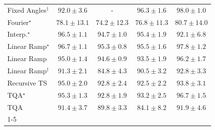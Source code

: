 \begin{tabular}{l|cccc|}
Fixed Angles$^\dagger$ & {\cellcolor[HTML]{056EAD}} \color[HTML]{F1F1F1} $92.0\pm 3.6$ & {\cellcolor[HTML]{000000}} \color[HTML]{F1F1F1} {\cellcolor{white}} \color{black} - & {\cellcolor[HTML]{034F7D}} \color[HTML]{F1F1F1} $96.3\pm 1.6$ & {\cellcolor[HTML]{023E62}} \color[HTML]{F1F1F1} $98.0\pm 1.0$ \\
Fourier$^\star$ & {\cellcolor[HTML]{CDD0E5}} \color[HTML]{000000} $78.1\pm 13.1$ & {\cellcolor[HTML]{EDE7F2}} \color[HTML]{000000} $74.2\pm 12.3$ & {\cellcolor[HTML]{D8D7E9}} \color[HTML]{000000} $76.8\pm 11.3$ & {\cellcolor[HTML]{ADC1DD}} \color[HTML]{000000} $80.7\pm 14.0$ \\
Interp.$^\star$ & {\cellcolor[HTML]{034D79}} \color[HTML]{F1F1F1} $96.5\pm 1.1$ & {\cellcolor[HTML]{045D92}} \color[HTML]{F1F1F1} $94.7\pm 1.0$ & {\cellcolor[HTML]{04588A}} \color[HTML]{F1F1F1} $95.4\pm 1.9$ & {\cellcolor[HTML]{056DAC}} \color[HTML]{F1F1F1} $92.1\pm 6.8$ \\
Linear Ramp$^\star$ & {\cellcolor[HTML]{034B76}} \color[HTML]{F1F1F1} $96.7\pm 1.1$ & {\cellcolor[HTML]{04598C}} \color[HTML]{F1F1F1} $95.3\pm 0.8$ & {\cellcolor[HTML]{045788}} \color[HTML]{F1F1F1} $95.5\pm 1.6$ & {\cellcolor[HTML]{034165}} \color[HTML]{F1F1F1} $97.8\pm 1.2$ \\
Linear Ramp & {\cellcolor[HTML]{045B8E}} \color[HTML]{F1F1F1} $95.0\pm 1.4$ & {\cellcolor[HTML]{045E93}} \color[HTML]{F1F1F1} $94.6\pm 0.9$ & {\cellcolor[HTML]{04649E}} \color[HTML]{F1F1F1} $93.5\pm 1.9$ & {\cellcolor[HTML]{034F7D}} \color[HTML]{F1F1F1} $96.2\pm 1.7$ \\
Linear Ramp$^\dagger$ & {\cellcolor[HTML]{0A73B2}} \color[HTML]{F1F1F1} $91.3\pm 2.1$ & {\cellcolor[HTML]{73A9CF}} \color[HTML]{F1F1F1} $84.8\pm 4.3$ & {\cellcolor[HTML]{167BB6}} \color[HTML]{F1F1F1} $90.5\pm 3.2$ & {\cellcolor[HTML]{0569A5}} \color[HTML]{F1F1F1} $92.8\pm 3.3$ \\
Recursive TS & {\cellcolor[HTML]{045B8E}} \color[HTML]{F1F1F1} $95.0\pm 2.0$ & {\cellcolor[HTML]{0569A5}} \color[HTML]{F1F1F1} $92.8\pm 2.4$ & {\cellcolor[HTML]{056BA7}} \color[HTML]{F1F1F1} $92.5\pm 2.2$ & {\cellcolor[HTML]{04629A}} \color[HTML]{F1F1F1} $93.8\pm 3.1$ \\
TQA$^\star$ & {\cellcolor[HTML]{04598C}} \color[HTML]{F1F1F1} $95.3\pm 1.3$ & {\cellcolor[HTML]{0569A5}} \color[HTML]{F1F1F1} $92.8\pm 1.9$ & {\cellcolor[HTML]{0567A1}} \color[HTML]{F1F1F1} $93.2\pm 2.5$ & {\cellcolor[HTML]{034B76}} \color[HTML]{F1F1F1} $96.7\pm 1.5$ \\
TQA & {\cellcolor[HTML]{0872B1}} \color[HTML]{F1F1F1} $91.4\pm 3.7$ & {\cellcolor[HTML]{2081B9}} \color[HTML]{F1F1F1} $89.8\pm 3.3$ & {\cellcolor[HTML]{7DACD1}} \color[HTML]{F1F1F1} $84.1\pm 8.2$ & {\cellcolor[HTML]{056FAE}} \color[HTML]{F1F1F1} $91.9\pm 4.6$ \\
\cline{1-5}
\bottomrule
\end{tabular}
